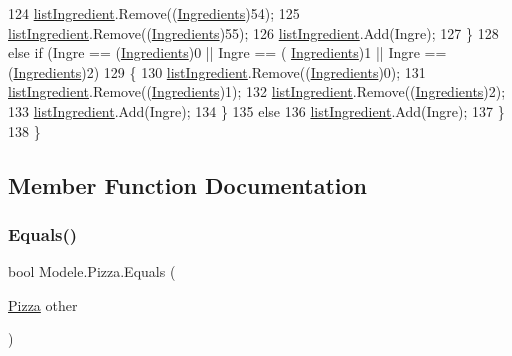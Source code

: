 \begin{DoxyCode}
124                     \hyperlink{classModele_1_1Pizza_ae05b1d6e08e5f801e3902c9c572a530b}{listIngredient}.Remove((\hyperlink{namespaceModele_a001a8e89e56a724f24a249ba98080d41}{Ingredients})54);
125                     \hyperlink{classModele_1_1Pizza_ae05b1d6e08e5f801e3902c9c572a530b}{listIngredient}.Remove((\hyperlink{namespaceModele_a001a8e89e56a724f24a249ba98080d41}{Ingredients})55);
126                     \hyperlink{classModele_1_1Pizza_ae05b1d6e08e5f801e3902c9c572a530b}{listIngredient}.Add(Ingre);
127                 \}
128                 \textcolor{keywordflow}{else} \textcolor{keywordflow}{if} (Ingre == (\hyperlink{namespaceModele_a001a8e89e56a724f24a249ba98080d41}{Ingredients})0 || Ingre == (
      \hyperlink{namespaceModele_a001a8e89e56a724f24a249ba98080d41}{Ingredients})1 || Ingre == (\hyperlink{namespaceModele_a001a8e89e56a724f24a249ba98080d41}{Ingredients})2)
129                 \{
130                     \hyperlink{classModele_1_1Pizza_ae05b1d6e08e5f801e3902c9c572a530b}{listIngredient}.Remove((\hyperlink{namespaceModele_a001a8e89e56a724f24a249ba98080d41}{Ingredients})0);
131                     \hyperlink{classModele_1_1Pizza_ae05b1d6e08e5f801e3902c9c572a530b}{listIngredient}.Remove((\hyperlink{namespaceModele_a001a8e89e56a724f24a249ba98080d41}{Ingredients})1);
132                     \hyperlink{classModele_1_1Pizza_ae05b1d6e08e5f801e3902c9c572a530b}{listIngredient}.Remove((\hyperlink{namespaceModele_a001a8e89e56a724f24a249ba98080d41}{Ingredients})2);
133                     \hyperlink{classModele_1_1Pizza_ae05b1d6e08e5f801e3902c9c572a530b}{listIngredient}.Add(Ingre);
134                 \}
135                 \textcolor{keywordflow}{else}
136                     \hyperlink{classModele_1_1Pizza_ae05b1d6e08e5f801e3902c9c572a530b}{listIngredient}.Add(Ingre);
137             \}
138         \}
\end{DoxyCode}


\subsection{Member Function Documentation}
\mbox{\label{classModele_1_1Pizza_aae4081338f65215bfcdc7845de6429e9}} 
\subsubsection{\texorpdfstring{Equals()}{Equals()}\hspace{0.1cm}{\footnotesize\ttfamily [1/2]}}
{\footnotesize\ttfamily bool Modele.\+Pizza.\+Equals (\begin{DoxyParamCaption}\item[{\hyperlink{classModele_1_1Pizza}{Pizza}}]{other }\end{DoxyParamCaption})\hspace{0.3cm}{\ttfamily [inline]}}



